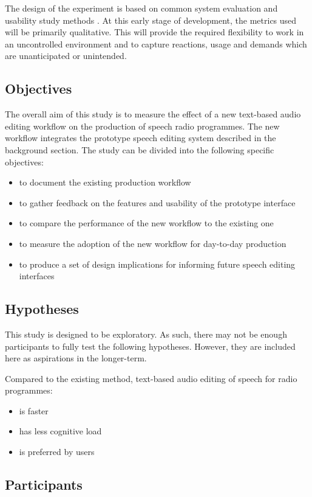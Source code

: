The design of the experiment is based on common system evaluation and usability
study methods \citep{Lindgaard1994}. At this early stage of development, the
metrics used will be primarily qualitative. This will provide the required
flexibility to work in an uncontrolled environment and to capture reactions,
usage and demands which are unanticipated or unintended.

\subsection{Objectives}
The overall aim of this study is to measure the effect of a new text-based
audio editing workflow on the production of speech radio programmes. The new
workflow integrates the prototype speech editing system described in the
background section. The study can be divided into the following specific
objectives:

\begin{itemize}
  \item to document the existing production workflow
  \item to gather feedback on the features and usability of the prototype interface
  \item to compare the performance of the new workflow to the existing one
  \item to measure the adoption of the new workflow for day-to-day production
  \item to produce a set of design implications for informing future speech editing interfaces
\end{itemize}

\subsection{Hypotheses}
This study is designed to be exploratory. As such, there may not be enough
participants to fully test the following hypotheses. However, they are included
here as aspirations in the longer-term.

Compared to the existing method, text-based audio editing of speech for radio
programmes:
\begin{itemize}
\item is faster
\item has less cognitive load
\item is preferred by users
\end{itemize}

\subsection{Participants}
